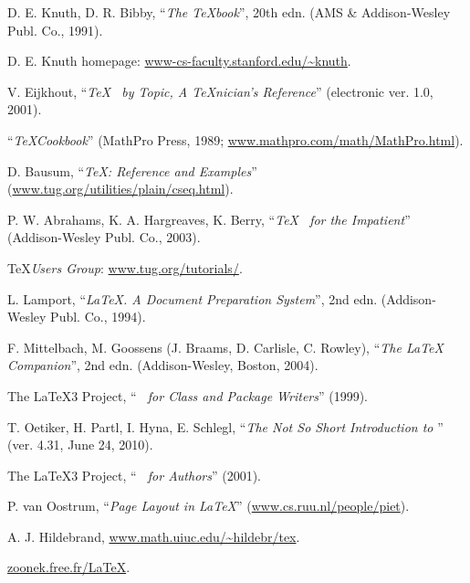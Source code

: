 \documentclass[myclassdoc,debug]{rjparticle}
\begin{document}
\begin{thebibliography}{99}
D. E. Knuth, D. R. Bibby, ``\textit{The \TeX book}'', 20th edn. (AMS \& Addison-Wesley Publ. Co., 1991).

 D. E. Knuth homepage: \href{http://www-cs-faculty.stanford.edu/~knuth/}{\small\ttfamily www-cs-faculty.stanford.edu/\~{}knuth}.

 V. Eijkhout, ``\textit{\TeX~ by Topic, A \TeX nician's Reference}'' (electronic ver. 1.0, 2001).

 ``\textit{\TeX Cookbook}'' (MathPro Press, 1989; \href{http://www.mathpro.com/math/MathPro.html}{\small\ttfamily www.mathpro.com/math/MathPro.html}).

 D. Bausum, ``\textit{\TeX: Reference and Examples}'' 
(\href{http://www.tug.org/utilities/plain/cseq.html}{\small\ttfamily www.tug.org/utilities/plain/cseq.html}).

 P. W. Abrahams, K. A. Hargreaves, K. Berry, ``\textit{\TeX~ for the Impatient}'' (Addison-Wesley Publ. Co., 2003).

\TeX  \textit{Users Group}: \href{http://www.tug.org/tutorials/}{\small\ttfamily www.tug.org/tutorials/}.

 L. Lamport, ``\textit{\LaTeX. A Document Preparation System}'', 2nd edn. (Addison-Wesley Publ. Co., 1994).

 F. Mittelbach, M. Goossens (J. Braams, D. Carlisle, C. Rowley), ``\textit{The \LaTeX~ Companion}'', 2nd edn. (Addison-Wesley, Boston, 2004).

 The \LaTeX3 Project, ``\textit{\LaTeXe~ for Class and Package Writers}'' (1999).

 T. Oetiker, H. Partl, I. Hyna, E. Schlegl, ``\textit{The Not So Short Introduction to \LaTeXe}'' (ver. 4.31, June 24, 2010).

 The \LaTeX3 Project, ``\textit{\LaTeXe~ for Authors}'' (2001).

 P. van Oostrum, ``\textit{Page Layout in \LaTeX}'' (\href{http://www.cs.ruu.nl/people/piet}{\small\ttfamily www.cs.ruu.nl/people/piet}).

A. J. Hildebrand, \href{http://www.math.uiuc.edu/~hildebr/tex/}{\small\ttfamily www.math.uiuc.edu/\~{}hildebr/tex}.

 \href{http://zoonek.free.fr/LaTeX/}{\small\ttfamily zoonek.free.fr/LaTeX}.


\end{thebibliography}
\end{document}
